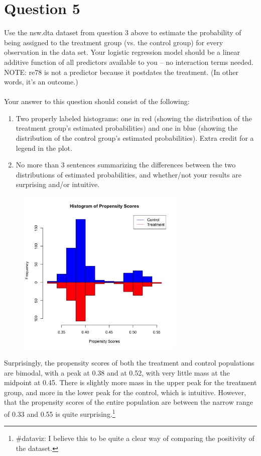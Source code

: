 \documentclass[11pt, oneside]{article}
\begin{document}
\newpage
\section*{Question 5}
Use the nsw.dta dataset from question 3 above to estimate the probability of being assigned to the treatment group (vs. the control group) for every observation in the data set. Your logistic regression model should be a linear additive function of all predictors available to you -- no interaction terms needed. NOTE: re78 is not a predictor because it postdates the treatment. (In other words, it's an outcome.) \\ \\ 
Your answer to this question should consist of the following:
\begin{enumerate}[label=(\alph*)]
\item Two properly labeled histograms: one in red (showing the distribution of the treatment group's estimated probabilities) and one in blue (showing the distribution of the control group's estimated probabilities). Extra credit for a legend in the plot.
\item No more than 3 sentences summarizing the differences between the two distributions of estimated probabilities, and whether/not your results are surprising and/or intuitive.
\end{enumerate}
\begin{figure}[h]
	\includegraphics[width = 8cm, height = 8cm]{propensity.jpg}
\end{figure}
Surprisingly, the propensity scores of both the treatment and control populations are bimodal, with a peak at 0.38 and at 0.52, with very little mass at the midpoint at 0.45. There is slightly more mass in the upper peak for the treatment group, and more in the lower peak for the control, which is intuitive. However, that the propensity scores of the entire population are between the narrow range of 0.33 and 0.55 is quite surprising.\footnote{\#dataviz: I believe this to be quite a clear way of comparing the positivity of the dataset.}
\end{document}

